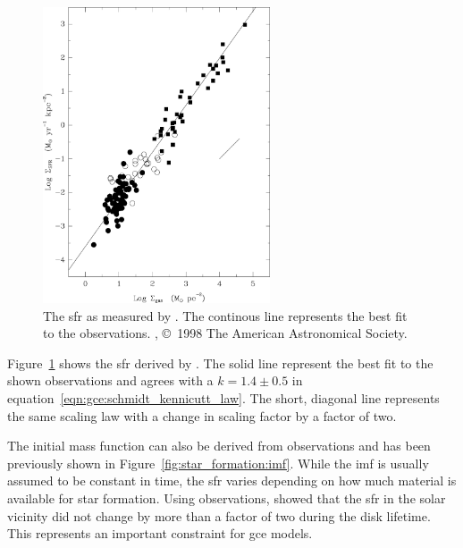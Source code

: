 \begin{figure}[tb]
    \centering
    \includegraphics[width=0.6\textwidth]{graphics/gce/schmidt_kennicutt}
    \caption{The \ac{sfr} as measured by \citet{kennicutt98}. The continous line represents the best fit to the observations. \citet{kennicutt98}, \copyright\ 1998 The American Astronomical Society.}
    \label{fig:gce:schmidt_kennicutt}
\end{figure}
Figure~\ref{fig:gce:schmidt_kennicutt} shows the \ac{sfr} derived by \citet{kennicutt98}. The solid line represent the best fit to the shown observations and agrees with a $k=1.4\pm0.5$ in equation~\eqref{eqn:gce:schmidt_kennicutt_law}. The short, diagonal line represents the same scaling law with a change in scaling factor by a factor of two.

The initial mass function can also be derived from observations and has been previously shown in Figure~\ref{fig:star_formation:imf}. While the \ac{imf} is usually assumed to be constant in time, the \ac{sfr} varies depending on how much material is available for star formation. Using observations, \citet{scalo86} showed that the \ac{sfr} in the solar vicinity did not change by more than a factor of two during the disk lifetime. This represents an important constraint for \ac{gce} models.




